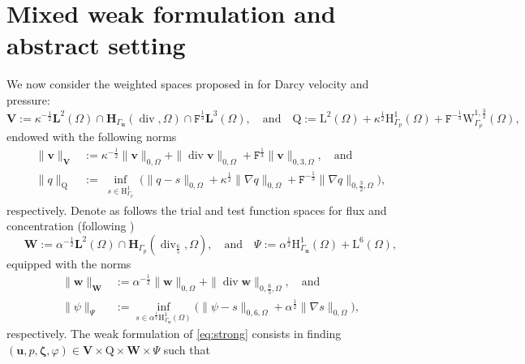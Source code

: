 \documentclass[11pt, reqno, a4paper, twoside]{article}
\newcommand{\bu}{\boldsymbol{u}}
\newcommand{\bv}{\boldsymbol{v}}
\newcommand{\bw}{\boldsymbol{w}}
\newcommand\bzeta{\boldsymbol{\zeta}}
\newcommand{\rF}{\mathtt{F}}
\newcommand{\rH}{\mathrm{H}}
\newcommand{\rL}{\mathrm{L}}
\newcommand{\rW}{\mathrm{W}}
\newcommand{\rQ}{\mathrm{Q}}
\newcommand{\bH}{\mathbf{H}}
\newcommand{\bL}{\mathbf{L}}
\newcommand{\bW}{\mathbf{W}}
\newcommand{\bV}{\mathbf{V}}
\newcommand\vdiv{\mathop{\mathrm{div}}\nolimits}
\numberwithin{equation}{section}
\numberwithin{remark}{section}
\numberwithin{figure}{section}
\numberwithin{table}{section}
\begin{document}
{\section{Mixed weak formulation and abstract setting}\label{sec:abstract}
We now consider the weighted spaces proposed in \cite[Section~3]{dhpr_sinum26} for Darcy velocity and pressure: 
\[\bV:=  \kappa^{-\frac{1}{2}}\bL^2(\Omega) \cap \bH_{\Gamma_{\bu}}(\vdiv,\Omega) \cap \rF^{\frac13} \bL^3(\Omega), \quad\text{and}\quad \rQ := \rL^2(\Omega) + \kappa^{\frac{1}{2}}\rH^1_{\Gamma_p}(\Omega) + \rF^{-\frac13}\rW^{1,\frac32}_{\Gamma_p}(\Omega),\]
endowed with the following norms 
\begin{subequations}\label{eq:norms}
    \begin{align}
   \|\bv\|_{\bV} &:= \kappa^{-\frac12}\|\bv\|_{0,\Omega} + \|\vdiv\bv\|_{0,\Omega} + \rF^{\frac13}\|\bv\|_{0,3,\Omega}, \quad\text{and}\\
   {\|q\|_{\rQ}}&:=\inf_{\substack{s\in\rH^1_{\Gamma_p}}}\bigl(\|q-s\|_{0,\Omega}+\kappa^{\frac12}\|\nabla q\|_{0,\Omega}+\rF^{-\frac13}\|\nabla q\|_{0,\frac32,\Omega}\bigr),\label{def:Qhat-norm}
    \end{align}
\end{subequations}
respectively. Denote as follows the trial and test function spaces for flux and concentration (following \cite[Section 3]{boon2021robust}) 
\[ \bW := \alpha^{-\frac12} \bL^2(\Omega) \cap \bH_{\Gamma_p}(\vdiv_{\frac65},\Omega), \quad \text{and}\quad\Psi := \alpha^{\frac12}\rH^1_{\Gamma_{\bu}}(\Omega) + \rL^6(\Omega), \]
equipped with the norms 
\begin{subequations}
\begin{align}\|\bw\|_{\bW} &:= \alpha^{-\frac12}\|\bw\|_{0,\Omega} + \| \vdiv \bw\|_{0,\frac65,\Omega},\quad\text{and} \\
\|\psi\|_{\Psi} &:= \inf_{s \in \alpha^{\frac12}\rH^1_{\Gamma_{\bu}}(\Omega)}\bigl(\|\psi-s\|_{0,6,\Omega} + \alpha^{\frac12}\|\nabla s\|_{0,\Omega} \bigr), \label{eq:Psi.norm}\end{align}\end{subequations}
respectively. The weak formulation of \eqref{eq:strong} consists in finding  $(\bu,p,\bzeta,\varphi)\in \bV\times \rQ\times \bW \times \Psi$ such that 
}
\end{document}
